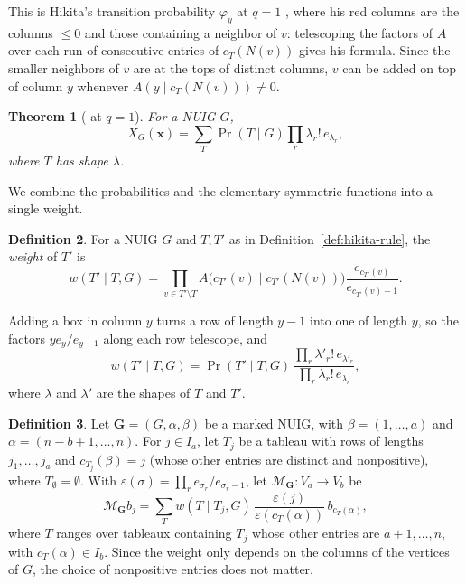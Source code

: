 \documentclass[12pt]{article}
\theoremstyle{plain}
\newtheorem{theorem}{Theorem}
\theoremstyle{definition}
\newtheorem{definition}[theorem]{Definition}
\theoremstyle{remark}
\newcommand{\bG}{\mathbf{G}}
\begin{document}
This is Hikita's transition probability $\varphi_y$ at $q=1$ \cite[Definitions 1.2 and 1.5]{stanstemproof}, where his red columns are the columns $\le0$ and those containing a neighbor of $v$: telescoping the factors of $A$ over each run of consecutive entries of $c_T(N(v))$ gives his formula. Since the smaller neighbors of $v$ are at the tops of distinct columns, $v$ can be added on top of column $y$ whenever $A(y\mid c_T(N(v)))\ne0$.


\begin{theorem}[{\cite[Theorem 1.6]{stanstemproof} at $q=1$}]\label{thm:hikita}
For a NUIG $G$,
\[
X_G(\bm x)=\sum_T\Pr(T\mid G)\prod_r\lambda_r!\,e_{\lambda_r},
\]
where $T$ has shape $\lambda$.
\end{theorem}

We combine the probabilities and the elementary symmetric functions into
a single weight.

\begin{definition}\label{def:weight}
For a NUIG $G$ and $T,T'$ as in Definition~\ref{def:hikita-rule}, the
\emph{weight} of $T'$ is
\[
w(T'\mid T,G)=\prod_{v\in T'\setminus T}
 A\bigl(c_{T'}(v)\mid c_{T'}(N(v))\bigr)
 \frac{e_{c_{T'}(v)}}{e_{c_{T'}(v)-1}}.
\]
\end{definition}

Adding a box in column $y$ turns a row of length $y-1$ into one of length
$y$, so the factors $ye_y/e_{y-1}$ along each row telescope, and
\begin{equation}\label{eq:weight-pr}
w(T'\mid T,G)=\Pr(T'\mid T,G)\,
 \frac{\prod_r\lambda'_r!\,e_{\lambda'_r}}{\prod_r\lambda_r!\,e_{\lambda_r}},
\end{equation}
where $\lambda$ and $\lambda'$ are the shapes of $T$ and $T'$.

\begin{definition}\label{def:graph-tableau}
Let $\bG=(G,\alpha,\beta)$ be a marked NUIG, with $\beta=(1,\dots,a)$ and
$\alpha=(n-b+1,\dots,n)$. For $j\in I_a$, let $T_j$ be a tableau with
rows of lengths $j_1,\dots,j_a$ and $c_{T_j}(\beta)=j$ (whose other
entries are distinct and nonpositive), where $T_\emptyset=\emptyset$. With
$\varepsilon(\sigma)=\prod_re_{\sigma_r}/e_{\sigma_r-1}$, let
$\mathcal M_\bG\colon V_a\to V_b$ be
\[
\mathcal M_\bG b_j=\sum_{T}w(T\mid T_j,G)\,
 \frac{\varepsilon(j)}{\varepsilon(c_T(\alpha))}\,b_{c_T(\alpha)},
\]
where $T$ ranges over tableaux containing $T_j$ whose other entries are
$a+1,\dots,n$, with $c_T(\alpha)\in I_b$. Since the weight
only depends on the columns of the vertices of $G$, the choice of
nonpositive entries does not matter.
\end{definition}
\end{document}
